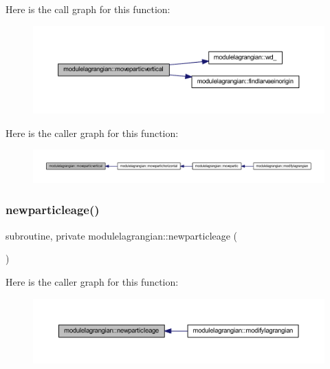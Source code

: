 Here is the call graph for this function\+:\nopagebreak
\begin{figure}[H]
\begin{center}
\leavevmode
\includegraphics[width=350pt]{namespacemodulelagrangian_aee1cf00f54feae6409c4674532876dcc_cgraph}
\end{center}
\end{figure}
Here is the caller graph for this function\+:\nopagebreak
\begin{figure}[H]
\begin{center}
\leavevmode
\includegraphics[width=350pt]{namespacemodulelagrangian_aee1cf00f54feae6409c4674532876dcc_icgraph}
\end{center}
\end{figure}
\mbox{\label{namespacemodulelagrangian_a05769d5d8e2cad0d654788eda4c8830e}} 
\subsubsection{\texorpdfstring{newparticleage()}{newparticleage()}}
{\footnotesize\ttfamily subroutine, private modulelagrangian\+::newparticleage (\begin{DoxyParamCaption}{ }\end{DoxyParamCaption})\hspace{0.3cm}{\ttfamily [private]}}

Here is the caller graph for this function\+:\nopagebreak
\begin{figure}[H]
\begin{center}
\leavevmode
\includegraphics[width=350pt]{namespacemodulelagrangian_a05769d5d8e2cad0d654788eda4c8830e_icgraph}
\end{center}
\end{figure}
\mbox{\label{namespacemodulelagrangian_a5afe5f1c46e068854f5c2eca0de8b0fb}} 
